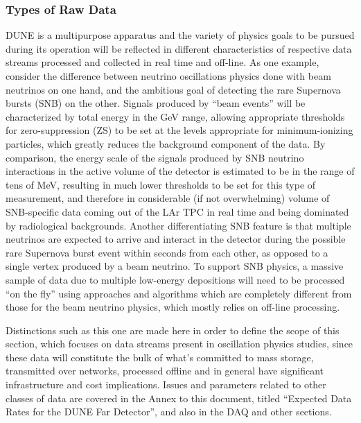 \subsubsection{Types of Raw Data}
DUNE is a multipurpose apparatus and the variety of physics goals to be pursued during its operation
will be reflected in different characteristics of respective data streams processed and collected in real time and off-line.
As one example, consider the difference between neutrino oscillations physics done with beam neutrinos
on one hand, and the ambitious goal of detecting the rare Supernova bursts (SNB) on the other.
Signals produced by ``beam events'' will be characterized by total energy in the GeV range, allowing
appropriate thresholds for zero-suppression (ZS) to be set at the levels appropriate for
minimum-ionizing particles, which greatly reduces the
background component of the data. By comparison, the energy scale of the signals produced by
SNB neutrino interactions in the active volume of the detector is estimated to be in the range of tens
of MeV, resulting in much lower thresholds to be set for this type of measurement, and therefore
in considerable (if not overwhelming) volume of SNB-specific data coming
out of the LAr TPC in real time and being dominated by radiological backgrounds.
Another differentiating SNB feature is that multiple neutrinos are expected
to arrive and interact in the detector during the possible rare Supernova burst event within seconds
from each other, as opposed to a single vertex produced by a beam neutrino.
To support SNB physics, a massive sample of data due to multiple low-energy
depositions will need to be processed ``on the fly''
using approaches and algorithms which are completely  different from those for the
beam neutrino physics, which mostly relies on off-line processing.

Distinctions such as this one are made here in order to define the scope of this section,
which focuses on data streams present in
oscillation physics studies, since these data will constitute the bulk of what's committed
to mass storage, transmitted over networks, processed offline and in general have significant
infrastructure and cost implications. Issues and parameters related to other classes of data
are covered in the Annex to this document, titled ``Expected Data Rates for the DUNE Far Detector'',
and also in the DAQ and other sections.

